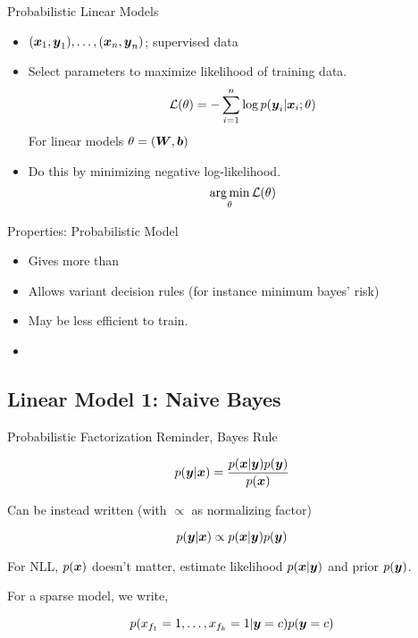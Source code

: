 \documentclass{beamer}
\begin{document}
\begin{frame}{Probabilistic Linear Models} 
  \begin{itemize}
  \item $(\boldsymbol{x}_1, \boldsymbol{y}_1), \ldots, (\boldsymbol{x}_n, \boldsymbol{y}_n)$; supervised data
  \item Select parameters to maximize likelihood of training data.
    \[ \mathcal{L}(\theta) = - \sum_{i=1}^n \log p(\boldsymbol{y}_i | \boldsymbol{x}_i; \theta) \] 
  For linear models $\theta = (\boldsymbol{W}, \boldsymbol{b})$ 

  \item Do this by minimizing negative log-likelihood.
    \[ \argmin_\theta \mathcal{L}(\theta)\] 
  \end{itemize}

\end{frame}

\begin{frame}{Properties: Probabilistic Model}
  \begin{itemize}
  \item Gives more than 
  \item Allows variant decision rules (for instance minimum bayes' risk)
  \end{itemize}
  
  \begin{itemize}
  \item May be less efficient to train. 
  \item 
  \end{itemize}
\end{frame}



\subsection{Linear Model 1: Naive Bayes}

\begin{frame}{Probabilistic Factorization} 
  Reminder, Bayes Rule

  \[ p(\boldsymbol{y} | \boldsymbol{x}) = \frac{p(\boldsymbol{x} | \boldsymbol{y}) p(\boldsymbol{y})}{p(\boldsymbol{x})} \] 

  Can be instead written (with $\propto$ as normalizing factor) 

  \[ p(\boldsymbol{y} | \boldsymbol{x}) \propto p(\boldsymbol{x} | \boldsymbol{y}) p(\boldsymbol{y}) \] 


  For NLL, $p(\boldsymbol{x})$ doesn't matter, estimate likelihood $p(\boldsymbol{x} | \boldsymbol{y})$ and
  prior $p(\boldsymbol{y})$.


  \air

  For a sparse model, we write, 
  
  \[p(x_{f_1}=1, \ldots, x_{f_k}=1 | \boldsymbol{y}=c ) p(\boldsymbol{y}=c)\]



\end{frame}
\end{document}
